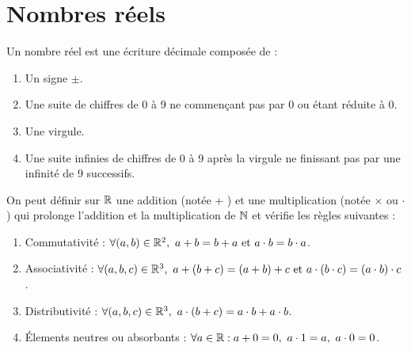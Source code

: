 \chapter{Nombres réels}\label{chap:nb_reels}

\begin{definition}\cite{cours_ressayre}
    Un nombre réel est une écriture décimale composée de :
    \begin{enumerate}
        \item Un signe $\pm$.
        \item Une suite de chiffres de 0 à 9 ne commençant pas par 0 ou étant réduite à 0.
        \item Une virgule.
        \item Une suite infinies de chiffres de 0 à 9 après la virgule ne finissant pas par une infinité de 9 successifs.
    \end{enumerate}
\end{definition}

\begin{proposition}
    On peut définir sur $\mathbb{R}$ une addition (notée \og + \fg) et une multiplication (notée \og $\times$ \fg ou \og $\cdot$ \fg) qui prolonge l'addition et la multiplication de $\mathbb{N}$ et vérifie les règles suivantes :
    \begin{enumerate}
        \item Commutativité : $\forall (a, b) \in \mathbb{R}^2,\ a + b = b + a \text{ et } a \cdot b = b \cdot a$.
        \item Associativité : $\forall (a, b, c) \in \mathbb{R}^3,\ a + (b + c) = (a + b) + c \text{ et } a \cdot (b \cdot c) = (a \cdot b) \cdot c$.
        \item Distributivité : $\forall (a, b, c) \in \mathbb{R}^3,\ a \cdot (b + c) = a \cdot b + a \cdot b$.
        \item \'Elements neutres ou absorbants : $\forall a \in \mathbb{R} : a + 0 = 0,\ a \cdot 1 = a,\ a \cdot 0 = 0$.
    \end{enumerate}
\end{proposition}


